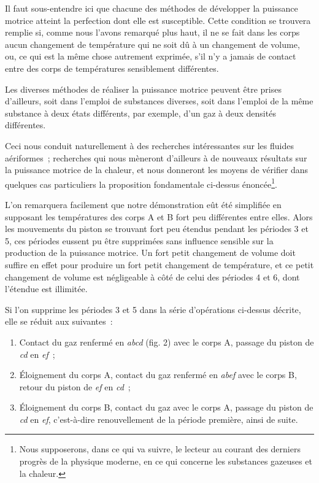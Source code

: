 \documentclass[french,twoside]{book} %
\begin{document}
Il faut sous-entendre ici que chacune des méthodes de développer la puissance motrice atteint la perfection dont elle est susceptible. Cette condition se trouvera remplie si, comme nous l’avons remarqué plus haut, il ne se fait dans les corps aucun changement de température qui ne soit dû à un changement de volume, ou, ce qui est la même chose autrement exprimée, s’il n’y a jamais de contact entre des corps de températures sensiblement différentes.\par
Les diverses méthodes de réaliser la puissance motrice peuvent être prises d’ailleurs, soit dans l’emploi de substances diverses, soit dans l’emploi de la même substance à deux états différents, par exemple, d’un gaz à deux densités différentes.\par
Ceci nous conduit naturellement à des recherches intéressantes sur les fluides aériformes ; recherches qui nous mèneront d’ailleurs à de nouveaux résultats sur la puissance motrice de la chaleur, et nous donneront les moyens de vérifier dans quelques cas particuliers la proposition fondamentale ci-dessus énoncée\footnote{Nous supposerons, dans ce qui va suivre, le lecteur au courant des derniers progrès de la physique moderne, en ce qui concerne les substances gazeuses et la chaleur.}.\par
L’on remarquera facilement que notre démonstration eût été simplifiée en supposant les températures des corps A et B fort peu différentes entre elles. Alors les mouvements du piston se trouvant fort peu étendus pendant les périodes 3 et 5, ces périodes eussent pu être supprimées sans influence sensible sur la production de la puissance motrice. Un fort petit changement de volume doit suffire en effet pour produire un fort petit changement de température, et ce petit changement de volume est négligeable à côté de celui des périodes 4 et 6, dont l’étendue est illimitée.\par
Si l’on supprime les périodes 3 et 5 dans la série d’opérations ci-dessus décrite, elle se réduit aux suivantes :\par

\begin{enumerate}[itemsep=0pt,topsep=0pt,partopsep=0pt,parskip=0pt]
\item Contact du gaz renfermé en \emph{abcd} (fig. 2) avec le corps A, passage du piston de \emph{cd} en \emph{ef} ;
\item Éloignement du corps A, contact du gaz renfermé en \emph{abef} avec le corps B, retour du piston de \emph{ef} en \emph{cd} ;
\item Éloignement du corps B, contact du gaz avec le corps A, passage du piston de \emph{cd} en \emph{ef}, c’est-à-dire renouvellement de la période première, ainsi de suite.
\end{enumerate}
\end{document}
